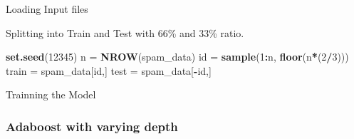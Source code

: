 \documentclass[]{article}
\newenvironment{Shaded}{\begin{snugshade}}{\end{snugshade}}
\newcommand{\KeywordTok}[1]{\textcolor[rgb]{0.13,0.29,0.53}{\textbf{#1}}}
\newcommand{\DataTypeTok}[1]{\textcolor[rgb]{0.13,0.29,0.53}{#1}}
\newcommand{\DecValTok}[1]{\textcolor[rgb]{0.00,0.00,0.81}{#1}}
\newcommand{\StringTok}[1]{\textcolor[rgb]{0.31,0.60,0.02}{#1}}
\newcommand{\OtherTok}[1]{\textcolor[rgb]{0.56,0.35,0.01}{#1}}
\newcommand{\OperatorTok}[1]{\textcolor[rgb]{0.81,0.36,0.00}{\textbf{#1}}}
\newcommand{\NormalTok}[1]{#1}
\begin{document}
Loading Input files

\begin{Shaded}
\end{Shaded}

Splitting into Train and Test with 66\% and 33\% ratio.

\begin{Shaded}
\begin{Highlighting}[]
\KeywordTok{set.seed}\NormalTok{(}\DecValTok{12345}\NormalTok{)}
\NormalTok{n =}\StringTok{  }\KeywordTok{NROW}\NormalTok{(spam_data)}
\NormalTok{id =}\StringTok{ }\KeywordTok{sample}\NormalTok{(}\DecValTok{1}\OperatorTok{:}\NormalTok{n, }\KeywordTok{floor}\NormalTok{(n}\OperatorTok{*}\NormalTok{(}\DecValTok{2}\OperatorTok{/}\DecValTok{3}\NormalTok{)))}
\NormalTok{train =}\StringTok{ }\NormalTok{spam_data[id,]}
\NormalTok{test =}\StringTok{ }\NormalTok{spam_data[}\OperatorTok{-}\NormalTok{id,]}
\end{Highlighting}
\end{Shaded}

Trainning the Model

\subsubsection{Adaboost with varying
depth}\label{adaboost-with-varying-depth}
\end{document}
